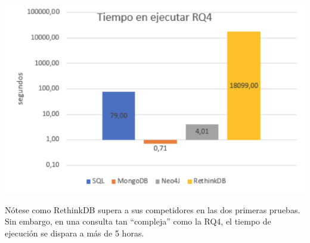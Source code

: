 \documentclass[11pt]{article}
\makeatletter
\def\maxwidth{\ifdim\Gin@nat@width>\linewidth\linewidth
    \else\Gin@nat@width\fi}
\let\Oldincludegraphics\includegraphics
\renewcommand{\includegraphics}[1]{\Oldincludegraphics[width=.8\maxwidth]{#1}}
\makeatother
\begin{document}
\includegraphics{grafico3.png}

    Nótese como RethinkDB supera a sus competidores en las dos primeras
pruebas. Sin embargo, en una consulta tan ``compleja'' como la RQ4, el
tiempo de ejecución se dispara a más de 5 horas.


    
    
    
    
\end{document}

